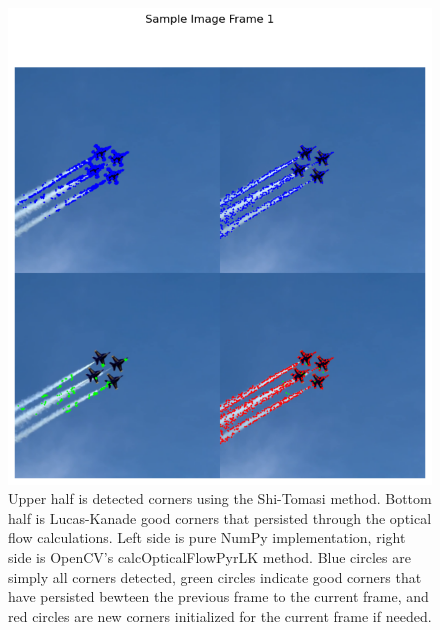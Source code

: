 \documentclass[11pt, conference, letterpaper]{IEEEtran}
\begin{document}
\begin{figure}[h]
    \centering
    \includegraphics[width=0.8\linewidth]{images/sample_image_1.png}
    \caption{Upper half is detected corners using the Shi-Tomasi method. Bottom half is Lucas-Kanade good corners that persisted through the optical flow calculations. Left side is pure NumPy implementation, right side is OpenCV's calcOpticalFlowPyrLK method. Blue circles are simply all corners detected, green circles indicate good corners that have persisted bewteen the previous frame to the current frame, and red circles are new corners initialized for the current frame if needed.}
    \label{fig:sample_2}
\end{figure}
\end{document}
